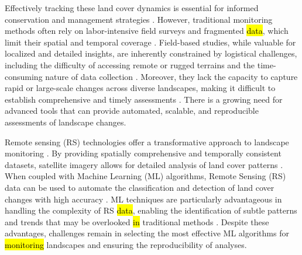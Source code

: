 \documentclass[jimaging,article,submit,pdftex,moreauthors]{Definitions/mdpi}
\begin{document}
Effectively tracking these land cover dynamics is essential for informed conservation and management strategies \cite{gutman2004land, AMICI201738}. However, traditional monitoring methods often rely on labor-intensive field surveys and fragmented \hl{data}, which limit their spatial and temporal coverage \cite{Lelli2018,Lelli,GLASER2024108798}. Field-based studies, while valuable for localized and detailed insights, are inherently constrained by logistical challenges, including the difficulty of accessing remote or rugged terrains and the time-consuming nature of data collection \cite{Alessi}. Moreover, they lack the capacity to capture rapid or large-scale changes across diverse landscapes, making it difficult to establish comprehensive and timely assessments \cite{Knollova2024,constrmater3010008}. There is a growing need for advanced tools that can provide automated, scalable, and reproducible assessments of landscape changes.

Remote sensing (RS) technologies offer a transformative approach to landscape monitoring \cite{BALDO2023101922,ZHU2022113266,earth5030024}. By providing spatially comprehensive and temporally consistent datasets, satellite imagery allows for detailed analysis of land cover patterns \cite{ANSELMETTO2024104973,BRACCHETTI2012157,jmse12081279}. When coupled with Machine Learning (ML) algorithms, Remote Sensing (RS) data can be used to automate the classification and detection of land cover changes with high accuracy \cite{w16081141}. ML techniques are particularly advantageous in handling the complexity of RS \hl{data}, enabling the identification of subtle patterns and trends that may be overlooked \hl{in} traditional methods \cite{BAOPHAM202417,jmse12050709}. Despite these advantages, challenges remain in selecting the most effective ML algorithms for \hl{monitoring} landscapes and ensuring the reproducibility of analyses.
\end{document}
